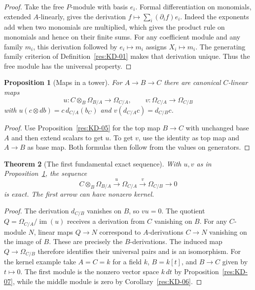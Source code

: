 \documentclass[11pt,oneside,openany]{book}
\newtheorem{theorem}{Theorem}[chapter]
\newtheorem{proposition}[theorem]{Proposition}
\theoremstyle{definition}
\theoremstyle{remark}
\begin{document}
\begin{proof}
Take the free $P$-module with basis $e_i$. Formal differentiation on monomials, extended $A$-linearly, gives the derivation $f\mapsto\sum_i(\partial_i f)e_i$. Indeed the exponents add when two monomials are multiplied, which gives the product rule on monomials and hence on their finite sums. For any coefficient module and any family $m_i$, this derivation followed by $e_i\mapsto m_i$ assigns $X_i\mapsto m_i$. The generating family criterion of Definition~\ref{res:KD-01} makes that derivation unique. Thus the free module has the universal property.
\end{proof}

\begin{proposition}[Maps in a tower]\label{res:KD-08}
For $A\to B\to C$ there are canonical $C$-linear maps
\[
 u:C\otimes_B\Omega_{B/A}\longrightarrow\Omega_{C/A},
 \qquad v:\Omega_{C/A}\longrightarrow\Omega_{C/B}
\]
with $u(c\otimes db)=c\,d_{C/A}(b_C)$ and $v(d_{C/A}c)=d_{C/B}c$.
\end{proposition}

\begin{proof}
Use Proposition~\ref{res:KD-05} for the top map $B\to C$ with unchanged base $A$ and then extend scalars to get $u$. To get $v$, use the identity as top map and $A\to B$ as base map. Both formulas then follow from the values on generators.
\end{proof}

\begin{theorem}[The first fundamental exact sequence]\label{res:KD-09}
With $u,v$ as in Proposition~\ref{res:KD-08}, the sequence
\[
 C\otimes_B\Omega_{B/A}\xrightarrow{\ u\ }\Omega_{C/A}
 \xrightarrow{\ v\ }\Omega_{C/B}\longrightarrow 0
\]
is exact. The first arrow can have nonzero kernel.
\end{theorem}

\begin{proof}
The derivation $d_{C/B}$ vanishes on $B$, so $v u=0$. The quotient $Q=\Omega_{C/A}/\operatorname{im}(u)$ receives a derivation from $C$ vanishing on $B$. For any $C$-module $N$, linear maps $Q\to N$ correspond to $A$-derivations $C\to N$ vanishing on the image of $B$. These are precisely the $B$-derivations. The induced map $Q\to\Omega_{C/B}$ therefore identifies their universal pairs and is an isomorphism. For the kernel example take $A=C=k$ for a field $k$, $B=k[t]$, and $B\to C$ given by $t\mapsto 0$. The first module is the nonzero vector space $k\,dt$ by Proposition~\ref{res:KD-07}, while the middle module is zero by Corollary~\ref{res:KD-06}.
\end{proof}
\end{document}
